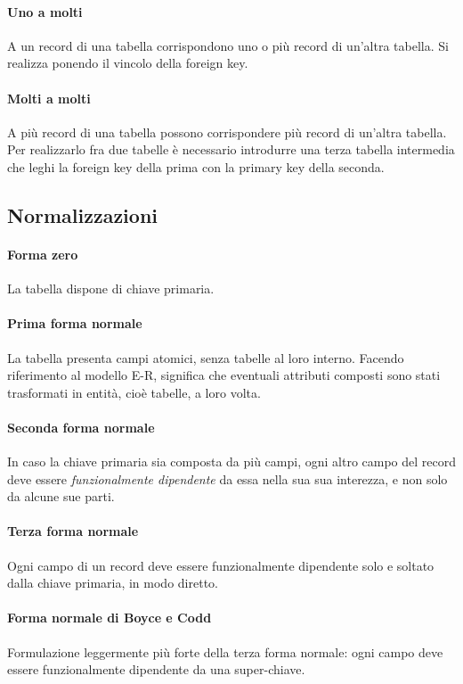 \documentclass{article}
\begin{document}
        \paragraph{Uno a molti} A un record di una tabella corrispondono uno o più record di un'altra tabella. Si realizza ponendo il vincolo della foreign key.
        \paragraph{Molti a molti} A più record di una tabella possono corrispondere più record di un'altra tabella. Per realizzarlo fra due tabelle è necessario introdurre una terza tabella intermedia che leghi la foreign key della prima con la primary key della seconda.
    \subsection{Normalizzazioni}
        \paragraph{Forma zero} La tabella dispone di chiave primaria.
        \paragraph{Prima forma normale} La tabella presenta campi atomici, senza tabelle al loro interno. Facendo riferimento al modello E-R, significa che eventuali attributi composti sono stati trasformati in entità, cioè tabelle, a loro volta.
        \paragraph{Seconda forma normale} In caso la chiave primaria sia composta da più campi, ogni altro campo del record deve essere \textit{funzionalmente dipendente} da essa nella sua sua interezza, e non solo da alcune sue parti.
        \paragraph{Terza forma normale} Ogni campo di un record deve essere funzionalmente dipendente solo e soltato dalla chiave primaria, in modo diretto.
        \paragraph{Forma normale di Boyce e Codd} Formulazione leggermente più forte della terza forma normale: ogni campo deve essere funzionalmente dipendente da una super-chiave.
\end{document}
